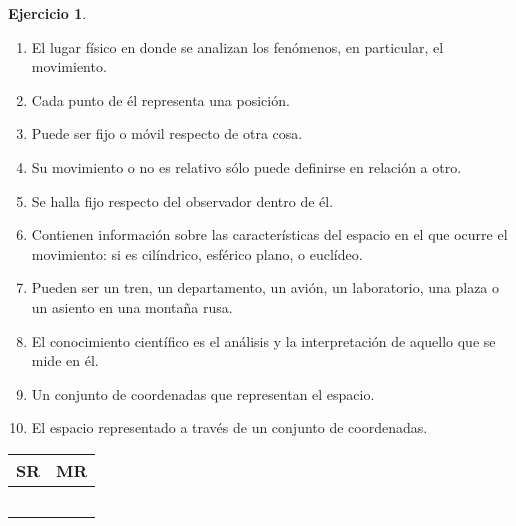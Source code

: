 \documentclass[a4paper,12pt,twoside]{book}
\newtheorem{ejercicio}{{Ejercicio}}[chapter]
\begin{document}
\begin{mdframed}[style=ejercicio-conceptual]
    \begin{ejercicio}
    \end{ejercicio}
    
    \begin{enumerate}
        \item El lugar físico en donde se analizan los fenómenos, en particular, el movimiento.
        
        \item Cada punto de él representa una posición.
        
        \item Puede ser fijo o móvil respecto de otra cosa.
        
        \item Su movimiento o no es relativo sólo puede definirse en relación a otro.
        
        \item Se halla fijo respecto del observador dentro de él.
        
        \item Contienen información sobre las características del espacio en el que ocurre el movimiento: si es cilíndrico, esférico plano, o euclídeo.
        
        \item Pueden ser un tren, un departamento, un avión, un laboratorio, una plaza o un asiento en una montaña rusa.
        
        \item El conocimiento científico es el análisis y la interpretación de aquello que se mide en él.
        
        \item Un conjunto de coordenadas que representan el espacio.
        
        \item El espacio representado a través de un conjunto de coordenadas.
    \end{enumerate}

    \begin{center}
        \begin{tabular}{|c|c|}
            \hline
            SR & MR
            \\
            \hline
            &\\
            &\\
            &\\
            &\\
            &\\
            \hline
        \end{tabular}
    \end{center}


\end{mdframed}
\end{document}
